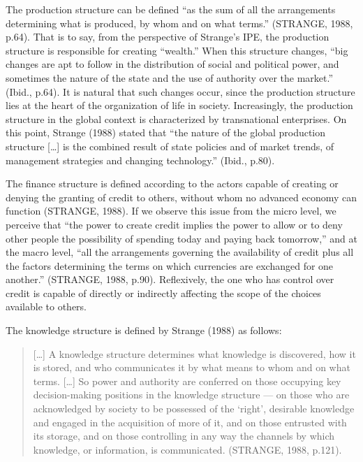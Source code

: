 The production structure can be defined ``as the sum of all the arrangements determining what is produced, by whom and on what terms.'' (STRANGE, 1988, p.64). That is to say, from the perspective of Strange's IPE, the production structure is responsible for creating ``wealth.'' When this structure changes, ``big changes are apt to follow in the distribution of social and political power, and sometimes the nature of the state and the use of authority over the market.'' (Ibid., p.64). It is natural that such changes occur, since the production structure lies at the heart of the organization of life in society. Increasingly, the production structure in the global context is characterized by transnational enterprises. On this point, Strange (1988) stated that ``the nature of the global production structure {[}\ldots{]} is the combined result of state policies and of market trends, of management strategies and changing technology.'' (Ibid., p.80).

The finance structure is defined according to the actors capable of creating or denying the granting of credit to others, without whom no advanced economy can function (STRANGE, 1988). If we observe this issue from the micro level, we perceive that ``the power to create credit implies the power to allow or to deny other people the possibility of spending today and paying back tomorrow,'' and at the macro level, ``all the arrangements governing the availability of credit plus all the factors determining the terms on which currencies are exchanged for one another.'' (STRANGE, 1988, p.90). Reflexively, the one who has control over credit is capable of directly or indirectly affecting the scope of the choices available to others.

The knowledge structure is defined by Strange (1988) as follows:

\begin{quote}
{[}\ldots{]} A knowledge structure determines what knowledge is discovered, how it is stored, and who communicates it by what means to whom and on what terms. {[}\ldots{]} So power and authority are conferred on those occupying key decision-making positions in the knowledge structure --- on those who are acknowledged by society to be possessed of the `right', desirable knowledge and engaged in the acquisition of more of it, and on those entrusted with its storage, and on those controlling in any way the channels by which knowledge, or information, is communicated. (STRANGE, 1988, p.121).
\end{quote}

